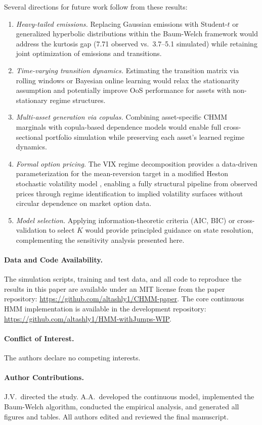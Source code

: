 Several directions for future work follow from these results:
\begin{enumerate}
    \item \textit{Heavy-tailed emissions.}
    Replacing Gaussian emissions with Student-$t$ or generalized hyperbolic distributions within the Baum-Welch framework would address the kurtosis gap (7.71 observed vs.\ 3.7--5.1 simulated) while retaining joint optimization of emissions and transitions.

    \item \textit{Time-varying transition dynamics.}
    Estimating the transition matrix via rolling windows or Bayesian online learning would relax the stationarity assumption and potentially improve OoS performance for assets with non-stationary regime structures.

    \item \textit{Multi-asset generation via copulas.}
    Combining asset-specific CHMM marginals with copula-based dependence models \citep{alswaidan2026hybrid} would enable full cross-sectional portfolio simulation while preserving each asset's learned regime dynamics.

    \item \textit{Formal option pricing.}
    The VIX regime decomposition provides a data-driven parameterization for the mean-reversion target in a modified Heston stochastic volatility model \citep{heston1993closed}, enabling a fully structural pipeline from observed prices through regime identification to implied volatility surfaces without circular dependence on market option data.

    \item \textit{Model selection.}
    Applying information-theoretic criteria (AIC, BIC) or cross-validation to select $K$ would provide principled guidance on state resolution, complementing the sensitivity analysis presented here.
\end{enumerate}

\paragraph{Data and Code Availability.}
The simulation scripts, training and test data, and all code to reproduce the results in this paper are available under an MIT license from the paper repository: \url{https://github.com/altashly1/CHMM-paper}.
The core continuous HMM implementation is available in the development repository: \url{https://github.com/altashly1/HMM-withJumps-WIP}.

\paragraph{Conflict of Interest.}
The authors declare no competing interests.

\paragraph{Author Contributions.}
J.V.\ directed the study.
A.A.\ developed the continuous model, implemented the Baum-Welch algorithm, conducted the empirical analysis, and generated all figures and tables.
All authors edited and reviewed the final manuscript.
